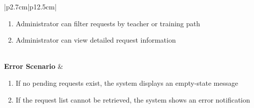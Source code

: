\begin{table}[H]
\begin{tabular}{|p{2.7cm}|p{12.5cm}|}
\begin{minipage}[t]{\linewidth}
\begin{enumerate}[topsep=0pt,itemsep=1pt,parsep=0pt,partopsep=0pt]
                                                template
                                          \item Administrator can filter requests by teacher or training path
                                          \item Administrator can view detailed request information
                                      \end{enumerate}
                                  \end{minipage}       \\
        \hline
        \textbf{Error Scenario} & \begin{minipage}[t]{\linewidth}
                                      \begin{enumerate}[topsep=0pt,itemsep=1pt,parsep=0pt,partopsep=0pt]
                                          \item If no pending requests exist, the system displays an empty-state message
                                          \item If the request list cannot be retrieved, the system shows an error notification
                                      \end{enumerate}
                                  \end{minipage} \\
        \hline
    \end{tabular}
    \label{tab:admin-list-vm-assignment-queue}
\end{table}
